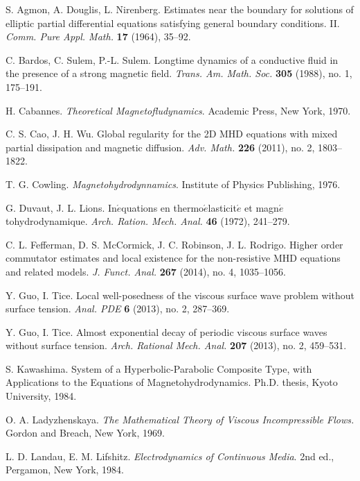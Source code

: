 \documentclass[a4paper,reqno,11pt]{amsart}
\numberwithin{equation}{section}
\begin{document}
 \begin{thebibliography}{99}

S. Agmon, A. Douglis, L. Nirenberg. Estimates near the boundary for solutions of elliptic partial differential equations satisfying general boundary conditions. II. \emph{Comm. Pure Appl. Math.} \textbf{17} (1964), 35--92.

C. Bardos, C. Sulem, P.-L. Sulem. Longtime dynamics of a conductive fluid in the presence of a strong magnetic field. \emph{Trans. Am. Math. Soc.} \textbf{305} (1988), no. 1, 175--191.

H. Cabannes. {\it Theoretical Magnetofludynamics}. Academic Press, New York, 1970.

C. S. Cao, J. H. Wu. Global regularity for the 2D MHD equations with mixed partial dissipation and magnetic diffusion. \emph{Adv. Math.} \textbf{226} (2011), no. 2, 1803--1822.

T. G. Cowling. {\it Magnetohydrodynnamics}. Institute of Physics Publishing, 1976.

G. Duvaut, J. L. Lions. In$\acute{e}$quations en thermo$\acute{e}$lasticit$\acute{e}$ et magn$\acute{e}$tohydrodynamique. \emph{Arch. Ration. Mech. Anal.} \textbf{46} (1972), 241--279.

C. L. Fefferman, D. S. McCormick, J. C. Robinson, J. L. Rodrigo. Higher order commutator estimates and local existence for the non-resistive MHD equations and related models. \emph{J. Funct. Anal.} \textbf{267} (2014),  no. 4, 1035--1056.

 Y. Guo, I. Tice. Local well-posedness of the viscous surface wave problem without surface tension.  \emph{Anal. PDE} \textbf{6} (2013), no. 2, 287--369.

Y. Guo, I. Tice.  Almost exponential decay of periodic viscous surface waves without surface tension.  \emph{Arch. Rational Mech. Anal.} \textbf{207} (2013), no. 2, 459--531.

S. Kawashima. System of a Hyperbolic-Parabolic Composite Type, with Applications to the Equations of Magnetohydrodynamics. Ph.D. thesis, Kyoto University, 1984.

O. A. Ladyzhenskaya. \emph{The Mathematical Theory of Viscous Incompressible Flows.}  Gordon and Breach, New York, 1969.

L. D. Landau, E. M. Lifshitz. \emph{Electrodynamics of Continuous Media}. 2nd ed., Pergamon, New York, 1984.


\end{thebibliography}
\end{document}
